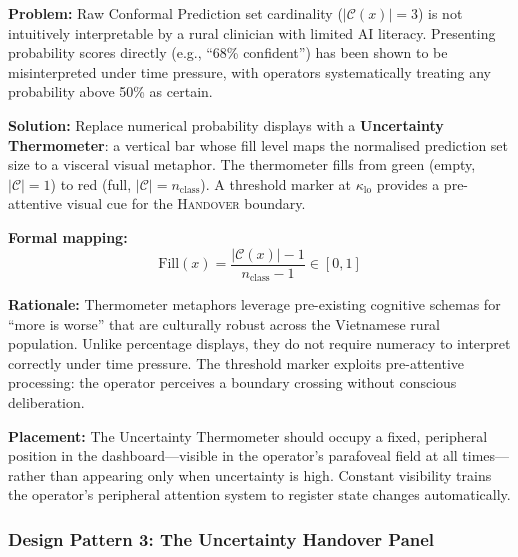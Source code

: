 \begin{tcolorbox}[patternbox,
  title={Design Pattern 2 --- The Uncertainty Thermometer}]
\textbf{Problem:} Raw Conformal Prediction set cardinality
($|\mathcal{C}(x)| = 3$) is not intuitively interpretable by a
rural clinician with limited AI literacy.
Presenting probability scores directly (e.g., ``68\% confident'')
has been shown to be misinterpreted under time pressure, with
operators systematically treating any probability above 50\% as
certain.

\textbf{Solution:} Replace numerical probability displays with a
\textbf{Uncertainty Thermometer}: a vertical bar whose fill level
maps the normalised prediction set size to a visceral visual
metaphor.
The thermometer fills from green (empty, $|\mathcal{C}|=1$) to
red (full, $|\mathcal{C}|=n_{\mathrm{class}}$).
A threshold marker at $\kappa_{\mathrm{lo}}$ provides a
pre-attentive visual cue for the \textsc{Handover} boundary.

\textbf{Formal mapping:}
\begin{equation}
  \label{eq:thermometer-fill}
  \mathrm{Fill}(x)
    = \frac{|\mathcal{C}(x)| - 1}{n_{\mathrm{class}} - 1}
    \in [0, 1]
\end{equation}

\textbf{Rationale:} Thermometer metaphors leverage pre-existing
cognitive schemas for ``more is worse'' that are culturally
robust across the Vietnamese rural population.
Unlike percentage displays, they do not require numeracy to
interpret correctly under time pressure.
The threshold marker exploits pre-attentive processing: the
operator perceives a boundary crossing without conscious
deliberation.

\textbf{Placement:} The Uncertainty Thermometer should occupy a
fixed, peripheral position in the dashboard---visible in the
operator's parafoveal field at all times---rather than appearing
only when uncertainty is high.
Constant visibility trains the operator's peripheral attention
system to register state changes automatically.
\end{tcolorbox}

\subsubsection{Design Pattern 3: The Uncertainty Handover Panel}
\label{subsubsec:pattern-handover-panel}

